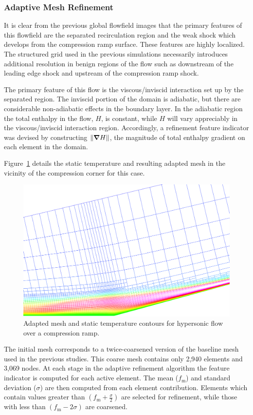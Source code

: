 \subsubsection{Adaptive Mesh Refinement}
It is clear from the previous global flowfield images that the primary features of this flowfield are the separated recirculation region and the weak shock which develops from the compression ramp surface.  These features are highly localized. The structured grid used in the previous simulations necessarily introduces additional resolution in benign regions of the flow such as downstream of the leading edge shock and upstream of the compression ramp shock.

The primary feature of this flow is the viscous/inviscid interaction set up by the separated region.  The inviscid portion of the domain is adiabatic, but there are considerable non-adiabatic effects in the boundary layer.  In the adiabatic region the total enthalpy in the flow, $H$, is constant, while $H$ will vary appreciably in the viscous/inviscid interaction region. Accordingly, a refinement feature indicator was devised by constructing $\|{\boldsymbol{\nabla}} {H}\|$, the magnitude of total enthalpy gradient on each element in the domain.

Figure~\ref{fig:ramp_amr} details the static temperature and resulting adapted mesh in the vicinity of the compression corner for this case.
\begin{figure}[hbtp]
  \begin{center}
    \includegraphics[width=\textwidth]{figures/holden_ramp/amr}
    \caption{Adapted mesh and static temperature contours for hypersonic flow over a compression ramp.\label{fig:ramp_amr}}
  \end{center}
\end{figure}
The initial mesh corresponds to a twice-coarsened version of the baseline mesh used in the previous studies. This coarse mesh contains only 2,940 elements and 3,069 nodes. At each stage in the adaptive refinement algorithm the feature indicator is computed for each active element.  The mean ($f_\text{m}$)  and standard deviation ($\sigma$) are then computed from each element contribution.  Elements which contain values greater than $\left(f_{\text{m}}+\frac{\sigma}{2}\right)$ are selected for refinement, while those with less than $\left(f_{\text{m}}-2\sigma\right)$ are coarsened. 

